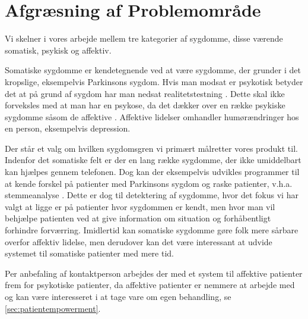 \section{Afgræsning af Problemområde}
Vi skelner i vores arbejde mellem tre kategorier af sygdomme, disse værende somatisk, psykisk og affektiv.

Somatiske sygdomme er kendetegnende ved at være sygdomme, der grunder i det kropslige, eksempelvis Parkinsons sygdom.
Hvis man modsat er psykotisk betyder det at på grund af sygdom har man nedsat realitetstestning \citep{misc:netpsykpsykose}.
Dette skal ikke forveksles med at man har en psykose, da det dækker over en række psykiske sygdomme såsom de affektive \citep{misc:netpsykpsykose}.
Affektive lidelser omhandler humørændringer hos en person, eksempelvis depression.

Der står et valg om hvilken sygdomsgren vi primært målretter vores produkt til.
Indenfor det somatiske felt er der en lang række sygdomme, der ikke umiddelbart kan hjælpes gennem telefonen.
Dog kan der eksempelvis udvikles programmer til at kende forskel på patienter med Parkinsons sygdom og raske patienter, v.h.a. stemmeanalyse \citep{6168572}.
Dette er dog til detektering af sygdomme, hvor det fokus vi har valgt at ligge er på patienter hvor sygdommen er kendt, men hvor man vil behjælpe patienten ved at give information om situation og forhåbentligt forhindre forværring.
Imidlertid kan somatiske sygdomme gøre folk mere sårbare overfor affektiv lidelse, men derudover kan det være interessant at udvide systemet til somatiske patienter med mere tid.

Per anbefaling af kontaktperson \citet{misc:janne-rasmussen} arbejdes der med et system til affektive patienter frem for psykotiske patienter, da affektive patienter er nemmere at arbejde med og kan være interesseret i at tage vare om egen behandling, se \cref{sec:patientempowerment}.